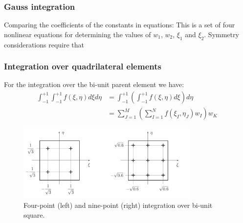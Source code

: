 \documentclass[notes]{beamer}
\begin{document}
\begin{frame}
\frametitle{Gauss integration}
Comparing the coefficients of the constants in equations:
This is a set of four nonlinear equations for determining the values of $w_1$, $w_2$, $\xi_1$ and $\xi_2$. Symmetry considerations require that

\end{frame}


\begin{frame}
\frametitle{Integration over quadrilateral elements}
For the integration over the bi-unit parent
element we have:
\begin{align*}
	\int_{-1}^{+1}	\int_{-1}^{+1} f(\xi, \eta) d\xi d\eta & = 	\int_{-1}^{+1}\left(		\int_{-1}^{+1}f(\xi, \eta) d\xi \right) d\eta\\
	& = \sum_{J=1}^M \left(\sum_{I=1}^N f(\xi_I, \eta_J) w_I\right) w_K
\end{align*}
\begin{figure}[ht]
	\centering
	\includegraphics[width=0.8\textwidth]{figs/gauss-integration-quadrilateral.png}
	\caption*{Four-point (left) and nine-point (right) integration over bi-unit square.}
\end{figure}
\end{frame}
\end{document}
